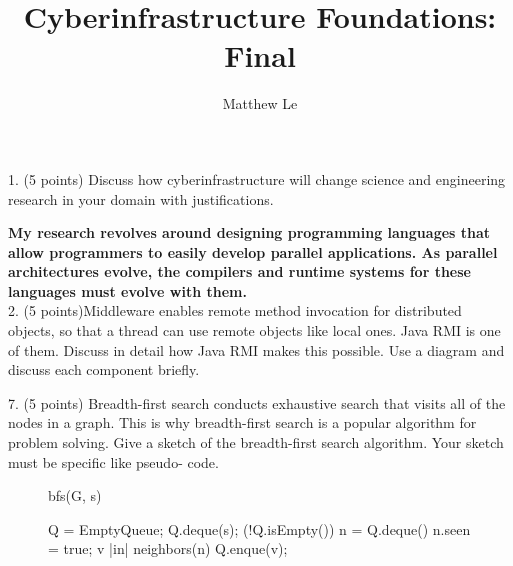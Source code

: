 \documentclass[11pt]{article}
\title{Cyberinfrastructure Foundations: Final}
\author{Matthew Le}
\begin{document}
\maketitle

1. (5 points) Discuss how cyberinfrastructure will change science and engineering research in your domain with justifications.

{\bf My research revolves around designing programming languages that allow programmers to easily develop parallel applications.  As parallel architectures evolve, the compilers and runtime systems for these languages must evolve with them.  }\\


2. (5 points)Middleware enables remote method invocation for distributed objects, so that a thread can use remote objects like local ones. Java RMI is one of them. Discuss in detail how Java RMI makes this possible. Use a diagram and discuss each component briefly.



7. (5 points) Breadth-first search conducts exhaustive search that visits all of the nodes in a graph. This is why breadth-first search is a popular algorithm for problem solving. Give a sketch of the breadth-first search algorithm. Your sketch must be specific like pseudo- code.

\begin{figure}[h]

\begin{program}
\PROC bfs(G, s) \BODY

	Q = EmptyQueue;
	Q.deque(s);
	\WHILE(!Q.isEmpty()) \DO
		n = Q.deque()
		n.seen = true;
		\FOR v\; |in| \; neighbors(n)\; \DO
			Q.enque(v);
		\END
	\END
	
\END
\end{program}

\end{figure}
\end{document}
